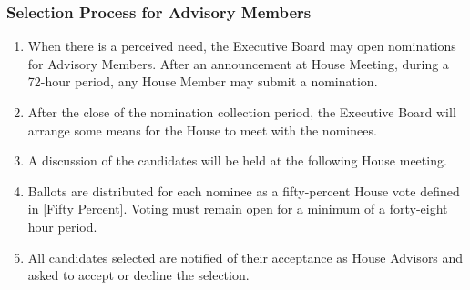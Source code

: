 \documentclass{article}
\newcommand{\bsubsection}[1]{\subsubsection{#1} \label{#1}}
\begin{document}
\bsubsection{Selection Process for Advisory Members}
\begin{enumerate}
	\item When there is a perceived need, the Executive Board may open nominations for Advisory Members.
		After an announcement at House Meeting, during a 72-hour period, any House Member may submit a nomination.
	\item After the close of the nomination collection period, the Executive Board will arrange some means for the House to meet with the nominees.
	\item A discussion of the candidates will be held at the following House meeting.
    \item Ballots are distributed for each nominee as a fifty-percent House vote defined in \ref{Fifty     
        Percent}. Voting must remain open for a minimum of a forty-eight hour period. 
	\item All candidates selected are notified of their acceptance as House Advisors and asked to accept or decline the selection.
\end{enumerate}
\end{document}
